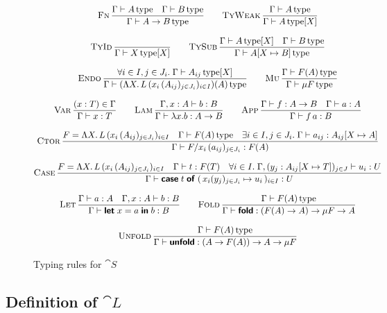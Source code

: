 \begin{figure}
  \begin{equation*}
    \setlength{\jot}{2.5ex}
    \begin{gathered}
      \infrule[Fn]{\Gamma \vdash \istype{A} \quad \Gamma \vdash \istype{B}}{\Gamma \vdash \istype{A \to B}} \qquad
      \infrule[TyWeak]{\Gamma \vdash \istype{A}}{\Gamma \vdash \istype{A}[X]} \\
      \infrule[TyId]{}{\Gamma \vdash \istype{X}[X]} \qquad
      \infrule[TySub]{\Gamma \vdash \istype{A}[X] \quad \Gamma \vdash \istype{B}}{\Gamma \vdash \istype{A[X \mapsto B]}} \\
      \infrule[Endo]{
        \forall i \in I,j \in J_i. \; \Gamma \vdash \istype{A_{ij}}[X]
      }{\Gamma \vdash \istype{(\Lambda X .\, L\,  (x_i \, (A_{ij})_{j \in J_i})_{i \in I})(A)}} \qquad
      \infrule[Mu]{
        \Gamma \vdash \istype{F(A)}
      }{\Gamma \vdash \istype{\mu F}} \\
      \infrule[Var]{(x : T) \in \Gamma}{\Gamma \vdash x : T} \qquad
      \infrule[Lam]{\Gamma, x : A \vdash b : B}{\Gamma \vdash \lambda x . b : A \to B} \qquad
      \infrule[App]{\Gamma \vdash f : A \to B \quad \Gamma \vdash a : A}{\Gamma \vdash f\,a : B} \\
      \infrule[Ctor]{F = \Lambda X .\, L\, (x_i \, (A_{ij})_{j \in J_i})_{i \in I} \quad \Gamma \vdash \istype{F(A)} \quad
        \exists i \in I, j \in J_i . \; \Gamma \vdash a_{ij} : A_{ij}[X \mapsto A]}
      {\Gamma \vdash F / x_i \, (a_{ij})_{j \in J_i} : F(A)} \\
      \infrule[Case]{F = \Lambda X .\, L\,  (x_i \, (A_{ij})_{j \in J_i})_{i \in I} \quad \Gamma \vdash t : F (T) \quad \forall i \in I . \; \Gamma , (y_j : A_{ij}[X \mapsto T])_{j \in J} \vdash u_i : U}
      {\Gamma \vdash \caseof{t}\; (\,\branch{x_i (y_j)_{j \in J_i}}{u_i}\,)_{i \in I} : U} \\
      \infrule[Let]{\Gamma \vdash a : A \quad \Gamma, x : A \vdash b : B}{\Gamma \vdash \letin{x}{a}{b} : B} \qquad
      \infrule[Fold]{\Gamma \vdash \istype{F(A)}}{\Gamma \vdash \inte{fold} : (F(A) \to A) \to \mu F \to A} \\
      \infrule[Unfold]{\Gamma \vdash \istype{F(A)}}{\Gamma \vdash \inte{unfold} : (A \to F(A)) \to A \to \mu F}
    \end{gathered}
  \end{equation*}
  \caption{Typing rules for $\cat S$}
\end{figure}

\subsection{Definition of $\cat L$}

